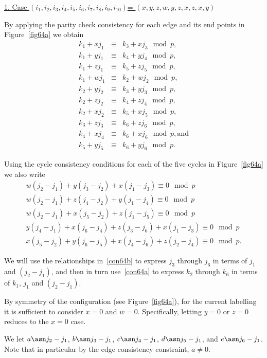 \underline{1. Case $(i_1,i_2,i_3,i_4,i_5,i_6,i_7,i_8,i_9,i_{10})$=
$(x,y,z,w,y,z,x,z,x,y)$}

By applying the parity check consistency for each edge and its end
points in Figure~\ref{fig64a} we obtain
\begin{equation}\label{con64a}\begin{array}{cccc}
k_1+xj_1 &\equiv& k_3+xj_3 \mod p, \\
k_1+yj_1 &\equiv& k_4+yj_4 \mod p,\\
k_1+zj_1 &\equiv& k_5+zj_5 \mod p, \\
k_1+wj_1 &\equiv& k_2+wj_2 \mod p, \\
k_2+yj_2 &\equiv& k_3+yj_3 \mod p, \\
k_2+zj_2 &\equiv& k_4+zj_4 \mod p, \\
k_2+xj_2 &\equiv& k_5+xj_5 \mod p, \\
k_3+zj_3 &\equiv& k_6+zj_6 \mod p, \\
k_4+xj_4 &\equiv& k_6+xj_6 \mod p,\text{and} \\
k_5+yj_5 &\equiv& k_6+yj_6 \mod p.
\end{array}\end{equation}

Using the cycle consistency conditions for each of the five cycles
in Figure~\ref{fig64a} we also write
\begin{equation}\label{con64b}\begin{array}{cccc}
w(j_2-j_1)+y(j_3-j_2)+x(j_1-j_3) \equiv 0 \mod p\\
w(j_2-j_1)+z(j_4-j_2)+y(j_1-j_4) \equiv 0 \mod p\\
w(j_2-j_1)+x(j_5-j_2)+z(j_1-j_5) \equiv 0 \mod p\\
y(j_4-j_1)+x(j_6-j_4)+z(j_3-j_6)+x(j_1-j_3) \equiv 0 \mod p\\
x(j_5-j_2)+y(j_6-j_5)+x(j_4-j_6)+z(j_2-j_4) \equiv 0 \mod p.
\end{array}\end{equation}


We will use the relationships in~\eqref{con64b} to express $j_3$
through $j_6$ in terms of $j_1$ and $(j_2-j_1)$, and then in turn
use~\eqref{con64a} to express $k_2 $ through $k_6$ in terms of
$k_1$, $j_1$ and $(j_2-j_1)$.


 By symmetry of the
configuration (see Figure~\ref{fig64a}), for the current labelling
it is sufficient to consider $x=0$ and $w=0$. Specifically,
letting $y=0$ or $z=0$ reduces to the $x=0$ case.

We let $a \asn j_2-j_1$, $b \asn j_3-j_1$, $c \asn j_4-j_1$,
 $d \asn j_5-j_1$, and $e \asn j_6-j_1$.  Note that in particular
 by the edge consistency constraint, $a \neq 0$.

